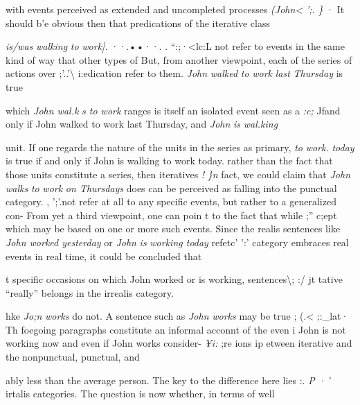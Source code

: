 with events perceived as extended and uncompleted processes \textit{(John{\textless}} \textit{'}\textit{;}\textit{.} \textit{\} }· It should b'e obvious then that predications of the iterative class

\textit{is/was} \textit{walki}\textit{n}\textit{g} \textit{to} \textit{wor}\textit{k}\textit{]. }··.••··. . ``:;·{\textless}lc:L not refer to events in the same kind of way that other types of But, from another viewpoint, each of the series of actions over ;'..'{\textbackslash} i:edication refer to them. \textit{John} \textit{walked} \textit{to} \textit{work} \textit{last} \textit{Thursday} is true

which \textit{John wal.k} \textit{s to work }ranges is itself an isolated event seen as a \textit{:}\textit{c}\textit{;} Jfand only if John walked to work last Thursday, and \textit{John} \textit{is} \textit{wal.king}

unit. If one regards the nature of the units in the series as primary, \textit{to} \textit{work.} \textit{today} is true if and only if John is walking to work today. rather than the fact that those units constitute a series, then iteratives \textit{!} \textit{\}n} fact, we could claim that \textit{John} \textit{walks} \textit{to} \textit{work} \textit{on Thurs}\textit{d}\textit{ays} does can be perceived as falling into the punctual category. , ';'.not refer at all to any specific events, but rather to a generalized con- From yet a third viewpoint, one can poin t to the fact that while ;'' c;ept which may be based on one or more such events. Since the realis sentences like \textit{John worked yesterday }or \textit{John} \textit{is} \textit{working today} refetc' ':' category embraces real events in real time, it could be concluded that

t specific occasions on which John worked or is working, sentences{\textbackslash}; :/ jt tative ``really'' belongs in the irrealis category.

hke \textit{J}\textit{o}\textit{;}\textit{n} \textit{works} do not. A sentence such as \textit{John} \textit{wor}\textit{k}\textit{s} may be true ; (.{\textless} ;:\_lat· Th foegoing paragraphs constitute an informal acconnt of the even i John is not working now and even if John works consider- \textit{¥}\textit{i}\textit{:} ;re ions ip etween iterative and the nonpunctual, punctual, and

ably less than the average person. The key to the difference here lies :. \textit{P} \textit{·} ' irtalis categories. The question is now whether, in terms of well\-

